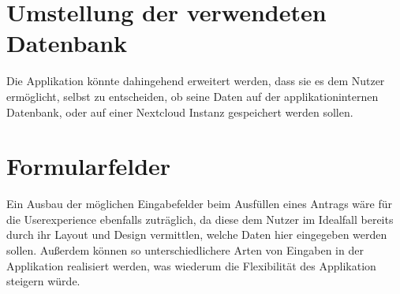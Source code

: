 \section{Umstellung der verwendeten Datenbank}\label{umstellung der verwendeten datenbank}
Die Applikation könnte dahingehend erweitert werden, dass sie es dem Nutzer ermöglicht, 
selbst zu entscheiden, ob seine Daten auf der applikationinternen Datenbank, oder auf einer 
Nextcloud Instanz gespeichert werden sollen. 

\section{Formularfelder}\label{sec: formularfelder}
Ein Ausbau der möglichen Eingabefelder beim Ausfüllen eines Antrags wäre für die 
Userexperience ebenfalls zuträglich, da diese dem Nutzer im Idealfall bereits durch ihr 
Layout und Design vermittlen, welche Daten hier eingegeben werden sollen. Außerdem können 
so unterschiedlichere Arten von Eingaben in der Applikation realisiert werden, was wiederum 
die Flexibilität des Applikation steigern würde.

